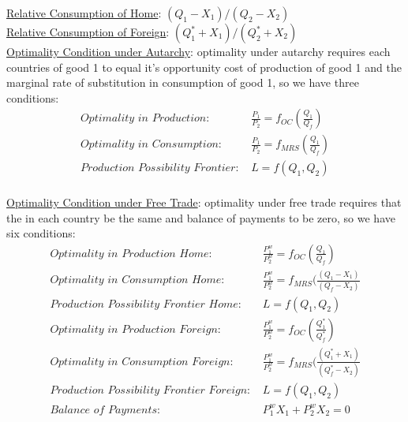 \documentclass{article}
\begin{document}
\underline{Relative Consumption of Home}: $(Q_{1}-X_{1})/(Q_{2}-X_{2})$ \\
\underline{Relative Consumption of Foreign}: $(Q_{1}^{*}+X_{1})/(Q_{2}^{*}+X_{2})$ \\
\underline{Optimality Condition under Autarchy}: optimality under autarchy requires each countries  of good 1 to equal it's opportunity cost of production of good 1 and the marginal rate of substitution in consumption of good 1, so we have three conditions:
\begin{align*}
  \textit{Optimality in Production: }& \tfrac{P_{1}}{P_{2}} = f_{OC}(\tfrac{Q_{1}}{Q_{f}}) \\
  \textit{Optimality in Consumption: }& \tfrac{P_{1}}{P_{2}} = f_{MRS}(\tfrac{Q_{1}}{Q_{f}}) \\
  \textit{Production Possibility Frontier: }& L = f(Q_{1}, Q_{2})
\end{align*} \\
\underline{Optimality Condition under Free Trade}: optimality under free trade requires that the  in each country be the same and balance of payments to be zero, so we have six conditions:
\begin{align*}
  \textit{Optimality in Production Home: }& \tfrac{P_{1}^{w}}{P_{2}^{w}} = f_{OC}(\tfrac{Q_{1}}{Q_{f}}) \\
  \textit{Optimality in Consumption Home: }& \tfrac{P_{1}^{w}}{P_{2}^{w}} = f_{MRS}(\tfrac{(Q_{1}-X_{1})}{(Q_{f}-X_{2})} \\
  \textit{Production Possibility Frontier Home: }& L = f(Q_{1}, Q_{2}) \\
  \textit{Optimality in Production Foreign: }& \tfrac{P_{1}^{w}}{P_{2}^{w}} = f_{OC}(\tfrac{Q_{1}^{*}}{Q_{f}^{*}}) \\
  \textit{Optimality in Consumption Foreign: }& \tfrac{P_{1}^{w}}{P_{2}^{w}} = f_{MRS}(\tfrac{(Q_{1}^{*}+X_{1})}{(Q_{f}^{*}-X_{2})} \\
  \textit{Production Possibility Frontier Foreign: }& L = f(Q_{1}, Q_{2}) \\
  \textit{Balance of Payments: }& P_{1}^{w}X_{1} + P_{2}^{w}X_{2} = 0
\end{align*}

\newpage
\end{document}
